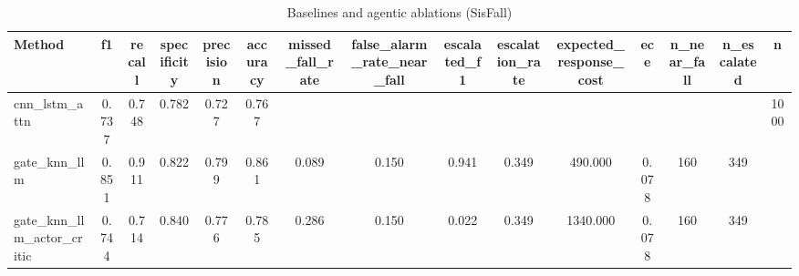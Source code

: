 \begin{table}[t]
\centering
\caption{Baselines and agentic ablations (SisFall)}
\begin{tabular}{lcccccccccccccc}
\toprule
Method & f1 & recall & specificity & precision & accuracy & missed_fall_rate & false_alarm_rate_near_fall & escalated_f1 & escalation_rate & expected_response_cost & ece & n_near_fall & n_escalated & n \\
\midrule
cnn_lstm_attn & 0.737 & 0.748 & 0.782 & 0.727 & 0.767 &  &  &  &  &  &  &  &  & 1000 \\
gate_knn_llm & 0.851 & 0.911 & 0.822 & 0.799 & 0.861 & 0.089 & 0.150 & 0.941 & 0.349 & 490.000 & 0.078 & 160 & 349 &  \\
gate_knn_llm_actor_critic & 0.744 & 0.714 & 0.840 & 0.776 & 0.785 & 0.286 & 0.150 & 0.022 & 0.349 & 1340.000 & 0.078 & 160 & 349 &  \\
\bottomrule
\end{tabular}
\end{table}